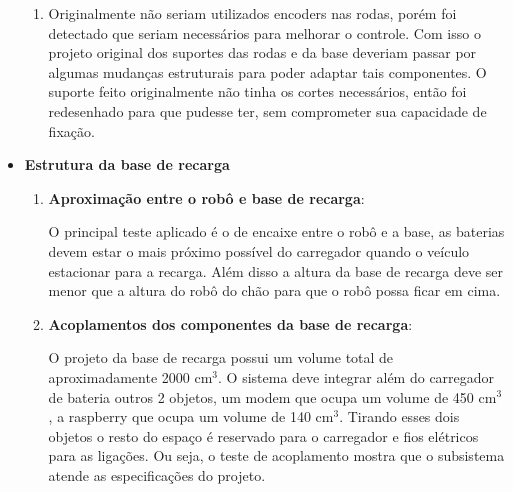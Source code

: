 \begin{itemize}
\begin{enumerate}
   			\item Originalmente não seriam utilizados encoders nas rodas, porém foi detectado que seriam necessários para melhorar o controle. Com isso o projeto original dos suportes das rodas e da base deveriam passar por algumas mudanças estruturais para poder adaptar tais componentes. O suporte feito originalmente não tinha os cortes necessários, então foi redesenhado para que pudesse ter, sem comprometer sua capacidade de fixação.

   		\end{enumerate}

   		\item \textbf{Estrutura da base de recarga}
   			\begin{enumerate}
   				\item \textbf{Aproximação entre o robô e base de recarga}:

   					O principal teste aplicado é o de encaixe entre o robô e a base, as baterias devem estar o mais próximo possível do carregador quando o veículo estacionar para a recarga. Além disso a altura da base de recarga deve ser menor que a altura do robô do chão para que o robô possa ficar em cima.


   				\item \textbf{Acoplamentos dos componentes da base de recarga}:

   					O projeto da base de recarga possui um volume total de aproximadamente 2000 cm$^3$. O sistema deve integrar além do carregador de bateria outros 2 objetos, um modem que ocupa um volume de 450 cm$^3$, a raspberry que ocupa um volume de 140 cm$^3$. Tirando esses dois objetos o resto do espaço é reservado para o carregador e fios elétricos para as ligações. Ou seja, o teste de acoplamento mostra que o subsistema atende as especificações do projeto.

   			\end{enumerate}

   \end{itemize}
   

